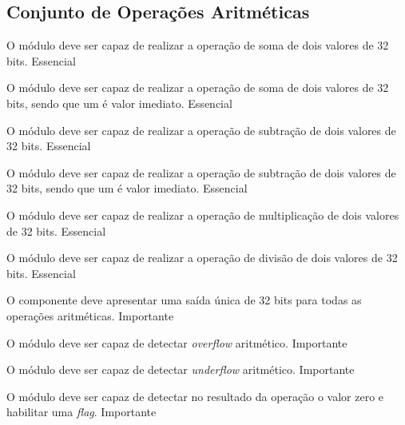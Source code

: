 \subsection{Conjunto de Operações Aritméticas} 
  
    \begin{functional}
      {O módulo deve ser capaz de realizar a operação de soma de dois valores de 32 bits.}
      {Essencial}
      
      {O módulo deve ser capaz de realizar a operação de soma de dois valores de 32 bits, sendo que um é valor imediato.}
      {Essencial}

      {O módulo deve ser capaz de realizar a operação de subtração de dois valores de 32 bits.}
      {Essencial}
      
      {O módulo deve ser capaz de realizar a operação de subtração de dois valores de 32 bits, sendo que um é valor imediato.}
      {Essencial}

      {O módulo deve ser capaz de realizar a operação de multiplicação de dois valores de 32 bits. }
      {Essencial}

      {O módulo deve ser capaz de realizar a operação de divisão de dois valores de 32 bits.}
      {Essencial} 
     

      {O componente deve apresentar uma saída única de 32 bits para todas as operações aritméticas.}
      {Importante}       

      {O módulo deve ser capaz de detectar \textit{overflow} aritmético.}
      {Importante}
      
      {O módulo deve ser capaz de detectar \textit{underflow} aritmético.}
      {Importante}
      
      {O módulo deve ser capaz de detectar no resultado da operação o valor zero e habilitar uma \textit{flag}.}
      {Importante}
      
    \end{functional}